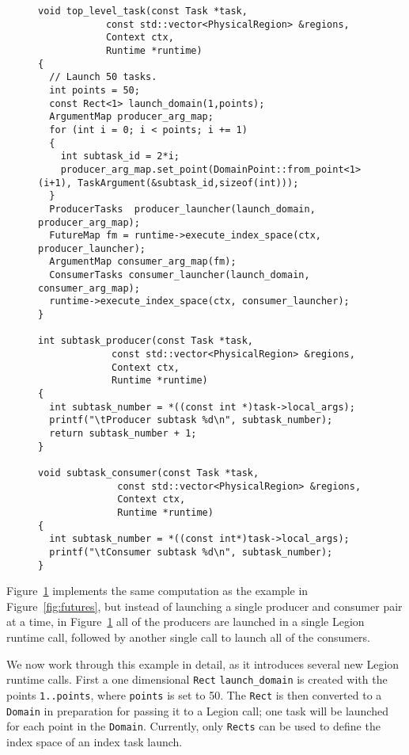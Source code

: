 \begin{figure}
{\small
\begin{lstlisting}
void top_level_task(const Task *task,
		    const std::vector<PhysicalRegion> &regions,
		    Context ctx, 
		    Runtime *runtime)
{
  // Launch 50 tasks.
  int points = 50;
  const Rect<1> launch_domain(1,points);
  ArgumentMap producer_arg_map;
  for (int i = 0; i < points; i += 1)
  {
    int subtask_id = 2*i;
    producer_arg_map.set_point(DomainPoint::from_point<1>(i+1), TaskArgument(&subtask_id,sizeof(int)));
  }
  ProducerTasks  producer_launcher(launch_domain, producer_arg_map);
  FutureMap fm = runtime->execute_index_space(ctx, producer_launcher);
  ArgumentMap consumer_arg_map(fm);
  ConsumerTasks consumer_launcher(launch_domain, consumer_arg_map);
  runtime->execute_index_space(ctx, consumer_launcher);
}

int subtask_producer(const Task *task,
		     const std::vector<PhysicalRegion> &regions,
		     Context ctx,
		     Runtime *runtime)
{
  int subtask_number = *((const int *)task->local_args);
  printf("\tProducer subtask %d\n", subtask_number);
  return subtask_number + 1;
}

void subtask_consumer(const Task *task,
		      const std::vector<PhysicalRegion> &regions,
		      Context ctx,
		      Runtime *runtime)
{
  int subtask_number = *((const int*)task->local_args);
  printf("\tConsumer subtask %d\n", subtask_number);
}
\end{lstlisting}
}
\caption{}
\label{fig:indexlaunch}
\end{figure}


Figure~\ref{fig:indexlaunch} implements the same computation as the example in
Figure~\ref{fig:futures}, but instead of launching a single
producer and consumer pair at a time, in Figure~\ref{fig:indexlaunch}
all of the producers are launched in a single Legion runtime call,
followed by another single call to launch all of the consumers.

We now work through this example in detail, as it introduces several
new Legion runtime calls.  First a one dimensional {\tt Rect} 
{\tt launch\_domain} is created with the points {\tt 1..points}, where
{\tt points} is set to 50. The {\tt Rect} is then converted to a {\tt
  Domain} in preparation for passing it to a Legion call; one task will
be launched for each point in the {\tt Domain}.  Currently, only
{\tt Rects} can be used to define the index space of an index task launch.

